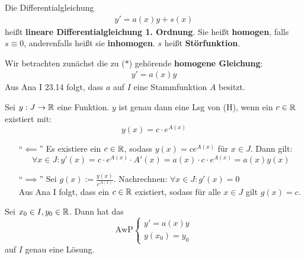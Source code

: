 \documentclass[a4paper,oneside,DIV15,BCOR12mm,chapterprefix=true,headings=onelinechapter]{scrbook}
\begin{document}
\begin{definition}
Die Differentialgleichung
\begin{align*}
& y'=a(x)y+s(x)&\tag{$*$}
\end{align*}
heißt \textbf{lineare Differentialgleichung 1. Ordnung}. Sie heißt \textbf{homogen},
falls $s\equiv 0$, anderenfalls heißt sie \textbf{inhomogen}. $s$ heißt \textbf{Störfunktion}.
\end{definition}

Wir betrachten zunächst die zu ($*$) gehörende \textbf{homogene Gleichung}:
\begin{align*}
&y'=a(x)y&\tag{H}
\end{align*}
Aus Ana I 23.14 folgt, dass $a$ auf $I$ eine Stammfunktion $A$ besitzt.

\begin{satz}
Sei $y:J\to\mathbb{R}$ eine Funktion. $y$ ist genau dann eine Lsg von (H), wenn ein $c\in\mathbb{R}$
existiert mit:
\[y(x)=c\cdot e^{A(x)}\]
\end{satz}

\begin{beweis}
\begin{enumerate}
\item["`$\impliedby$"'] Es existiere ein $c\in\mathbb{R}$, sodass $y(x)=ce^{A(x)}$ für $x\in J$. Dann gilt:
\[\forall x\in J: y'(x)=c\cdot e^{A(x)}\cdot A'(x)=a(x)\cdot c\cdot e^{A(x)}=a(x)y(x)\]
\item["`$\implies$"'] Sei $g(x):=\frac{y(x)}{e^{A(x)}}$. Nachrechnen: $\forall x\in J:g'(x)=0$\\
Aus Ana I folgt, dass ein $c\in\mathbb{R}$ existiert, sodass für alle $x\in J$ gilt $g(x)=c$.
\end{enumerate}
\end{beweis}

\begin{satz}
Sei $x_0\in I,y_0\in\mathbb{R}$. Dann hat das
\[\text{AwP}
\begin{cases}
y'=a(x)y\\
y(x_0)=y_0
\end{cases}\]
auf $I$ genau eine Lösung.
\end{satz}
\end{document}
